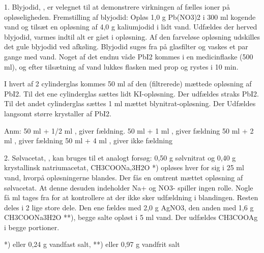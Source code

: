
\danskkemi{}

1. Blyjodid, , er velegnet til at demonstrere virkningen af fælles ioner
på opløseligheden.
Fremstilling af blyjodid: Opløs 1,0 g Pb(NO3)2 i 300 ml kogende vand og tilsæt
en opløsning af 4,0 g kaliumjodid i lidt vand. Udfældes der herved blyjodid,
varmes indtil alt er gået i opløsning. Af den farveløse opløsning udskilles
det gule blyjodid ved afkøling.
Blyjodid suges fra på glasfilter og vaskes et par gange med vand. Noget af
det endnu våde PbI2 kommes i en medicinflaske (500 ml), og efter tilsætning af
vand lukkes flasken med prop og rystes i 10 min.

I hvert af 2 cylinderglas kommes 50 ml af den (filtrerede) mættede opløsning
af PbI2.
Til det ene cylinderglas sættes lidt KI-opløsning. Der udfældes straks PbI2.
Til det andet cylinderglas sættes 1 ml mættet blynitrat-opløsning. Der Udfældes
langsomt større krystaller af PbI2.

Anm: 50 ml  + 1/2 ml , giver fældning.
50 ml  + 1 ml , giver fældning
50 ml  + 2 ml , giver fældning
50 ml  + 4 ml , giver ikke fældning

2. Sølvacetat, , kan bruges til et analogt forsøg:
0,50 g sølvnitrat og 0,40 g krystallinsk natriumacetat, CH3COONa,3H2O *) opløses
hver for sig i 25 ml vand, hvorpå opløsningerne blandes. Der fås en omtrent
mættet opløsning af sølvacetat. At denne desuden indeholder Na+ og NO3- spiller
ingen rolle. Nogle få ml tages fra for at kontrollere at der ikke sker
udfældning i blandingen.
Resten deles i 2 lige store dele. Den ene fældes med 2,0 g AgNO3, den anden med
1,6 g CH3COONa3H2O **), begge salte opløst i 5 ml vand. Der udfældes CH3COOAg
i begge portioner.

*) eller 0,24 g vandfast salt, **) eller 0,97 g vandfrit salt
